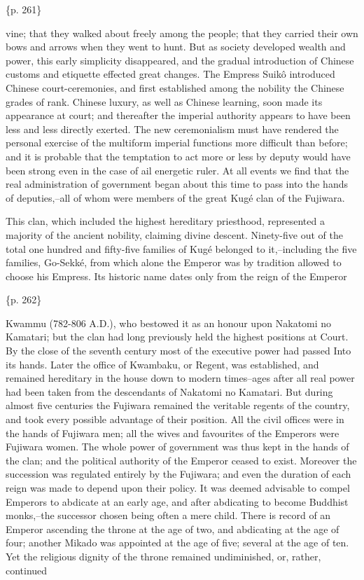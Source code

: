 \{p. 261\}

vine; that they walked about freely among the people; that they carried their own bows and arrows when they went to hunt. But as society developed wealth and power, this early simplicity disappeared, and the gradual introduction of Chinese customs and etiquette effected great changes. The Empress Suikô introduced Chinese court-ceremonies, and first established among the nobility the Chinese grades of rank. Chinese luxury, as well as Chinese learning, soon made its appearance at court; and thereafter the imperial authority appears to have been less and less directly exerted. The new ceremonialism must have rendered the personal exercise of the multiform imperial functions more difficult than before; and it is probable that the temptation to act more or less by deputy would have been strong even in the case of ail energetic ruler. At all events we find that the real administration of government began about this time to pass into the hands of deputies,--all of whom were members of the great Kugé clan of the Fujiwara.

This clan, which included the highest hereditary priesthood, represented a majority of the ancient nobility, claiming divine descent. Ninety-five out of the total one hundred and fifty-five families of Kugé belonged to it,--including the five families, Go-Sekké, from which alone the Emperor was by tradition allowed to choose his Empress. Its historic name dates only from the reign of the Emperor

\{p. 262\}

Kwammu (782-806 A.D.), who bestowed it as an honour upon Nakatomi no Kamatari; but the clan had long previously held the highest positions at Court. By the close of the seventh century most of the executive power had passed Into its hands. Later the office of Kwambaku, or Regent, was established, and remained hereditary in the house down to modern times--ages after all real power had been taken from the descendants of Nakatomi no Kamatari. But during almost five centuries the Fujiwara remained the veritable regents of the country, and took every possible advantage of their position. All the civil offices were in the hands of Fujiwara men; all the wives and favourites of the Emperors were Fujiwara women. The whole power of government was thus kept in the hands of the clan; and the political authority of the Emperor ceased to exist. Moreover the succession was regulated entirely by the Fujiwara; and even the duration of each reign was made to depend upon their policy. It was deemed advisable to compel Emperors to abdicate at an early age, and after abdicating to become Buddhist monks,--the successor chosen being often a mere child. There is record of an Emperor ascending the throne at the age of two, and abdicating at the age of four; another Mikado was appointed at the age of five; several at the age of ten. Yet the religious dignity of the throne remained undiminished, or, rather, continued

